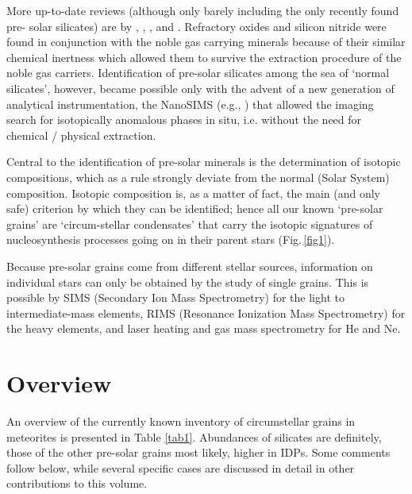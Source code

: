 \documentclass{iau}
\begin{document}
More up-to-date reviews (although only barely including the only recently found pre-
solar silicates) are by 
\cite[Zinner (1998)]{Zinner98}, 
\cite[Hoppe \& Zinner (2000)]{HoppeZinner00}, 
\cite[Nittler (2003)]{Nittler03}, and 
\cite[Zinner (2004)]{Zinner04}. 
Refractory oxides and silicon nitride were found in conjunction with the noble gas
carrying minerals because of their similar chemical inertness which allowed them to survive
the extraction procedure of the noble gas carriers. Identification of pre-solar silicates among
the sea of `normal silicates', however, became possible only with the advent of a new
generation of analytical instrumentation, the NanoSIMS (e.g., 
\cite[Hoppe et al. 2004]{Hoppe_etal04}) that allowed
the imaging search for isotopically anomalous phases in situ, i.e. without the need for
chemical / physical extraction.

Central to the identification of pre-solar minerals is the determination of isotopic
compositions, which as a rule strongly deviate from the normal (Solar System) composition.
Isotopic composition is, as a matter of fact, the main (and only safe) criterion by which they
can be identified; hence all our known `pre-solar grains' are `circum-stellar condensates' that
carry the isotopic signatures of nucleosynthesis processes going on in their parent stars
(Fig.\,\ref{fig1}).

Because pre-solar grains come from different stellar sources, information on individual
stars can only be obtained by the study of single grains. This is possible by SIMS (Secondary
Ion Mass Spectrometry) for the light to intermediate-mass elements, RIMS (Resonance
Ionization Mass Spectrometry) for the heavy elements, and laser heating and gas mass
spectrometry for He and Ne.

\section{Overview}

An overview of the currently known inventory of circumstellar grains in meteorites is
presented in Table \ref{tab1}. Abundances of silicates are definitely, those of the other pre-solar
grains most likely, higher in IDPs. Some comments follow below, while several specific cases
are discussed in detail in other contributions to this volume.
\end{document}
